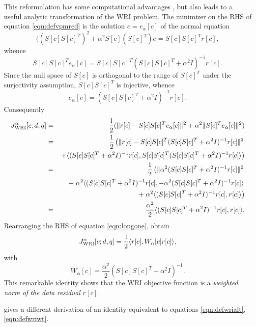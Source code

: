 This reformulation has some computational advantages \cite[]{WangYingst:SEG16,Herrmann:SEG19}, but also leads to a useful analytic transformation of the WRI problem. The minimizer on the RHS of equation \ref{eqn:defvpmred} is the solution $e=e_{\alpha}[c]$ of the normal equation
\[
 ( (S[c]S[c]^T)^2 + \alpha^2S[c](S[c]^T)e = S[c]S[c]^Tr[c],
\]
whence
\[
  S[c]S[c]^Te_{\alpha}[c] = S[c]S[c]^T(S[c]S[c]^T+\alpha^2I)^{-1}r[c].
\]
Since the null space of $S[c]$ is orthogonal to the range of $S[c]^T$
under the surjectivity assumption, $S[c]S[c]^T$ is injective, whence
\begin{equation}
  \label{eqn:norsol}
  e_{\alpha}[c]=(S[c]S[c]^T+\alpha^2I)^{-1}r[c].
\end{equation}
Consequently
\begin{eqnarray}
  J_{\rm WRI}^{\alpha}[c;d,q] &=&
  \frac{1}{2}(\|r[c]-S[c]S[c]^Te_{\alpha}[c]\|^2+\alpha^2\|S[c]^Te_{\alpha}[c]\|^2)\nonumber\\
  &=& \frac{1}{2}\left(\|r[c]-S[c]S[c]^T
    (S[c]S[c]^T+\alpha^2I)^{-1}r[c]\|^2\right. \nonumber\\
  & &
  \left.+\langle (S[c]S[c]^T+\alpha^2I)^{-1}r[c],
  S[c]S[c]^T (S[c]S[c]^T+\alpha^2I)^{-1}r[c]
  \rangle\right)  \nonumber\\
  &=&\frac{1}{2}\left(\|\alpha^2 (S[c]S[c]^T+\alpha^2I)^{-1}r[c]\|^2\right. \nonumber\\
  & &
  + \left. \alpha^2 \langle (S[c]S[c]^T+\alpha^2I)^{-1}r[c],
  - \alpha^2 (S[c]S[c]^T+\alpha^2I)^{-1}r[c]\rangle\right. \nonumber\\
  & &  + \left. \alpha^2\langle (S[c]S[c]^T+\alpha^2I)^{-1}r[c],r[c]\rangle\right) \nonumber\\
  &=&  \frac{\alpha^2}{2}\langle
      (S[c]S[c]^T+\alpha^2I)^{-1}r[c],r[c]\rangle.
   \label{eqn:longone}
\end{eqnarray}
Rearranging the RHS of equation \ref{eqn:longone}, obtain
\begin{equation}
  \label{eqn:defwrialt}
  J_{\rm WRI}^{\alpha}[c;d,q] = \frac{1}{2}\langle r[c], W_{\alpha}[c] r[c]\rangle,
\end{equation}
with
\begin{equation}
  \label{eqn:defwriwt}
  W_{\alpha}[c] = \frac{\alpha^2}{2}(S[c]S[c]^T+\alpha^2I)^{-1}.
\end{equation}
This remarkable identity shows that the WRI objective function is a
{\em weighted norm of the data residual $r[c]$}.

\cite{Leeuwen2019note} gives a different derivation of an identity
equivalent to equations \ref{eqn:defwrialt}, \ref{eqn:defwriwt}.

